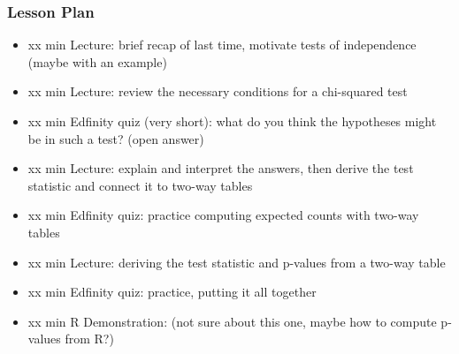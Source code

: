 \begin{frame}
    \frametitle{Lesson Plan}
    \begin{itemize}
        \item xx min Lecture: brief recap of last time, motivate tests of independence (maybe with an example)
        \item xx min Lecture: review the necessary conditions for a chi-squared test
        \item xx min Edfinity quiz (very short): what do you think the hypotheses might be in such a test? (open answer)
        \item xx min Lecture: explain and interpret the answers, then derive the test statistic and connect it to two-way tables
        \item xx min Edfinity quiz: practice computing expected counts with two-way tables
        \item xx min Lecture: deriving the test statistic and p-values from a two-way table
        \item xx min Edfinity quiz: practice, putting it all together
        \item xx min R Demonstration: (not sure about this one, maybe how to compute p-values from R?)
    \end{itemize}
\end{frame}
            
   
